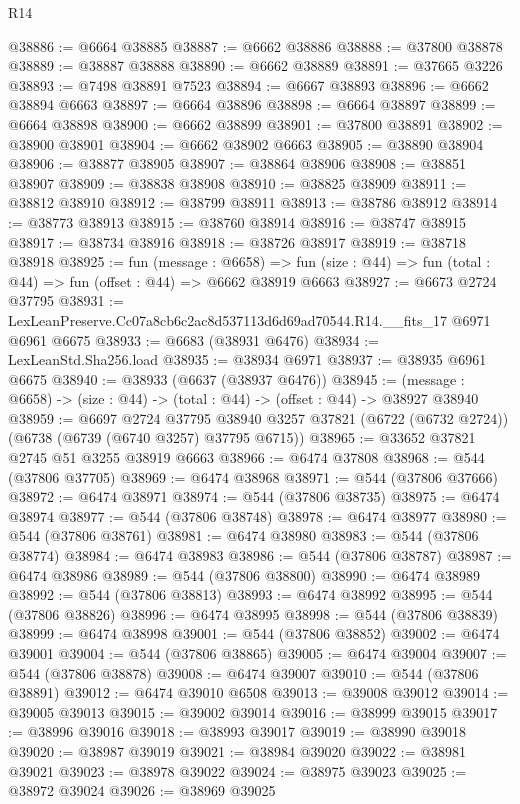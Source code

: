 \begin{lexlean}{R14}
\begin{coremodule}
@38886 := @6664 @38885
@38887 := @6662 @38886
@38888 := @37800 @38878
@38889 := @38887 @38888
@38890 := @6662 @38889
@38891 := @37665 @3226
@38893 := @7498 @38891 @7523
@38894 := @6667 @38893
@38896 := @6662 @38894 @6663
@38897 := @6664 @38896
@38898 := @6664 @38897
@38899 := @6664 @38898
@38900 := @6662 @38899
@38901 := @37800 @38891
@38902 := @38900 @38901
@38904 := @6662 @38902 @6663
@38905 := @38890 @38904
@38906 := @38877 @38905
@38907 := @38864 @38906
@38908 := @38851 @38907
@38909 := @38838 @38908
@38910 := @38825 @38909
@38911 := @38812 @38910
@38912 := @38799 @38911
@38913 := @38786 @38912
@38914 := @38773 @38913
@38915 := @38760 @38914
@38916 := @38747 @38915
@38917 := @38734 @38916
@38918 := @38726 @38917
@38919 := @38718 @38918
@38925 := fun (message : @6658) =>
  fun (size : @44) => fun (total : @44) => fun (offset : @44) => @6662 @38919 @6663
@38927 := @6673 @2724 @37795
@38931 := LexLeanPreserve.Cc07a8cb6c2ac8d537113d6d69ad70544.R14.__fits_17 @6971 @6961 @6675
@38933 := @6683 (@38931 @6476)
@38934 := LexLeanStd.Sha256.load
@38935 := @38934 @6971
@38937 := @38935 @6961 @6675
@38940 := @38933 (@6637 (@38937 @6476))
@38945 := (message : @6658) -> (size : @44) -> (total : @44) -> (offset : @44) -> @38927 @38940
@38959 := @6697
    @2724
    @37795
    @38940
    @3257
    @37821
    (@6722 (@6732 @2724))
    (@6738 (@6739 (@6740 @3257) @37795 @6715))
@38965 := @33652 @37821 @2745 @51 @3255 @38919 @6663
@38966 := @6474 @37808
@38968 := @544 (@37806 @37705)
@38969 := @6474 @38968
@38971 := @544 (@37806 @37666)
@38972 := @6474 @38971
@38974 := @544 (@37806 @38735)
@38975 := @6474 @38974
@38977 := @544 (@37806 @38748)
@38978 := @6474 @38977
@38980 := @544 (@37806 @38761)
@38981 := @6474 @38980
@38983 := @544 (@37806 @38774)
@38984 := @6474 @38983
@38986 := @544 (@37806 @38787)
@38987 := @6474 @38986
@38989 := @544 (@37806 @38800)
@38990 := @6474 @38989
@38992 := @544 (@37806 @38813)
@38993 := @6474 @38992
@38995 := @544 (@37806 @38826)
@38996 := @6474 @38995
@38998 := @544 (@37806 @38839)
@38999 := @6474 @38998
@39001 := @544 (@37806 @38852)
@39002 := @6474 @39001
@39004 := @544 (@37806 @38865)
@39005 := @6474 @39004
@39007 := @544 (@37806 @38878)
@39008 := @6474 @39007
@39010 := @544 (@37806 @38891)
@39012 := @6474 @39010 @6508
@39013 := @39008 @39012
@39014 := @39005 @39013
@39015 := @39002 @39014
@39016 := @38999 @39015
@39017 := @38996 @39016
@39018 := @38993 @39017
@39019 := @38990 @39018
@39020 := @38987 @39019
@39021 := @38984 @39020
@39022 := @38981 @39021
@39023 := @38978 @39022
@39024 := @38975 @39023
@39025 := @38972 @39024
@39026 := @38969 @39025

\end{coremodule}
\end{lexlean}
